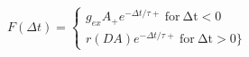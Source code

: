  $F(\Delta t) =  \begin{cases} g_{ex}A_{+} e^{−\Delta t/τ+}\:\mathrm{for\:\Delta t <0}\\r(DA) e^{−\Delta t/τ+}\:\mathrm{for\:\Delta t > 0}\} \end{cases}$
 